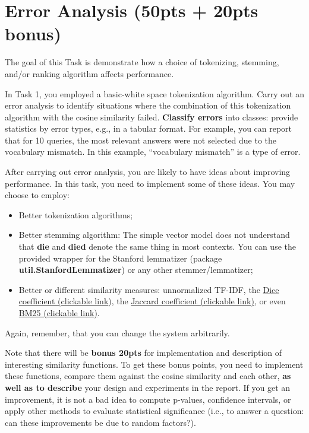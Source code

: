 \documentclass[oneside,11pt]{memoir}
\begin{document}
\chapter{Error Analysis (50pts + 20pts bonus)}
\label{SectionError}
The goal of this Task is demonstrate how a choice of tokenizing, stemming, and/or ranking
algorithm affects performance.

In Task 1, you employed a basic-white space tokenization algorithm.
Carry out an error analysis to identify situations where the
combination of this tokenization algorithm with the cosine similarity failed.
\textbf{Classify errors} into classes: provide statistics
by error types, e.g., in a tabular format.
For example, you can report that for 10 queries, the most relevant answers
were not selected due to the vocabulary mismatch. In this example,
``vocabulary mismatch'' is a type of error.

After carrying out error analysis,
you are likely to have ideas about improving performance.
In this task, you need to implement some of these ideas.
You may choose to employ:

\begin{itemize}
\item Better tokenization algorithms;
\item Better stemming algorithm: The simple vector model does not understand 
that \textbf{die} and \textbf{died} denote the same thing in most contexts.
You can use the provided wrapper for the Stanford lemmatizer (package \textbf{util.StanfordLemmatizer})
or any other stemmer/lemmatizer;
\item Better or different similarity measures: unnormalized TF-IDF,
the \href{http://en.wikipedia.org/wiki/S%C3%B8rensen%E2%80%93Dice_coefficient}{Dice coefficient (clickable link}), the \href{http://en.wikipedia.org/wiki/Jaccard_index}{Jaccard coefficient (clickable link)},
or even \href{http://en.wikipedia.org/wiki/Okapi_BM25}{BM25 (clickable link)}.
\end{itemize}
Again, remember, that you can change the system arbitrarily.

Note that there will be \textbf{bonus 20pts} for implementation and description
of interesting similarity functions. 
To get these bonus points, you need to 
implement these functions, compare them against the cosine similarity and each other,
\textbf{as well as to describe} your design and experiments in the report.
If you get an improvement, it is not a bad idea to compute p-values,
confidence intervals, or apply other methods to evaluate statistical significance (i.e.,
to answer a question: can these improvements be due to random factors?).
\end{document}
